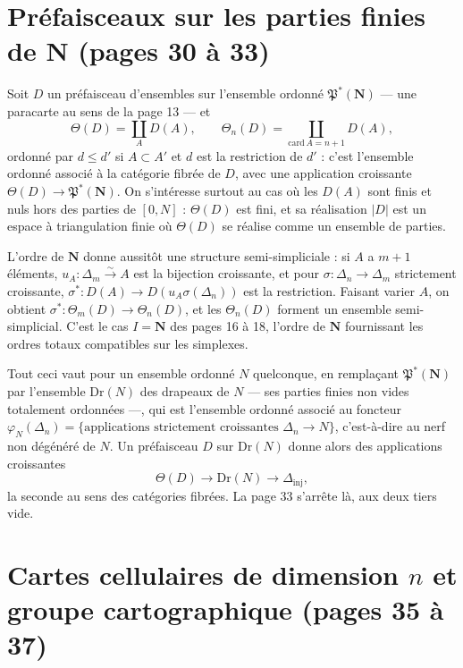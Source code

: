 \documentclass[11pt,a4paper]{article}
\begin{document}
\section*{Préfaisceaux sur les parties finies de $\mathbf{N}$ (pages 30 à 33)}

Soit $D$ un préfaisceau d'ensembles sur l'ensemble ordonné
$\mathfrak{P}^*(\mathbf{N})$ --- une paracarte au sens de la page 13 --- et
\[
  \Theta(D) = \coprod_{A} D(A), \qquad \Theta_n(D) =
  \coprod_{\mathrm{card}\, A = n+1} D(A) ,
\]
ordonné par $d \leqslant d'$ si $A \subset A'$ et $d$ est la restriction de
$d'$ : c'est l'ensemble ordonné associé à la catégorie fibrée de $D$, avec une
application croissante $\Theta(D) \to \mathfrak{P}^*(\mathbf{N})$. On
s'intéresse surtout au cas où les $D(A)$ sont finis et nuls hors des parties
de $[0, N]$ : $\Theta(D)$ est fini, et sa réalisation $|D|$ est un espace à
triangulation finie où $\Theta(D)$ se réalise comme un ensemble de parties.

L'ordre de $\mathbf{N}$ donne aussitôt une structure semi-simpliciale : si
$A$ a $m+1$ éléments, $u_A : \Delta_m \xrightarrow{\sim} A$ est la bijection
croissante, et pour $\sigma : \Delta_n \to \Delta_m$ strictement croissante,
$\sigma^* : D(A) \to D(u_A\sigma(\Delta_n))$ est la restriction. Faisant
varier $A$, on obtient $\sigma^* : \Theta_m(D) \to \Theta_n(D)$, et les
$\Theta_n(D)$ forment un ensemble semi-simplicial. C'est le cas $I =
\mathbf{N}$ des pages 16 à 18, l'ordre de $\mathbf{N}$ fournissant les ordres
totaux compatibles sur les simplexes.

Tout ceci vaut pour un ensemble ordonné $N$ quelconque, en remplaçant
$\mathfrak{P}^*(\mathbf{N})$ par l'ensemble $\mathrm{Dr}(N)$ des drapeaux de
$N$ --- ses parties finies non vides totalement ordonnées ---, qui est
l'ensemble ordonné associé au foncteur $\varphi_N(\Delta_n) =
\{\text{applications strictement croissantes } \Delta_n \to N\}$, c'est-à-dire
au nerf non dégénéré de $N$. Un préfaisceau $D$ sur $\mathrm{Dr}(N)$ donne
alors des applications croissantes
\[
  \Theta(D) \longrightarrow \mathrm{Dr}(N) \longrightarrow \Delta_{\mathrm{inj}} ,
\]
la seconde au sens des catégories fibrées. La page 33 s'arrête là, aux deux
tiers vide.

\section*{Cartes cellulaires de dimension $n$ et groupe cartographique (pages 35 à 37)}
\end{document}
